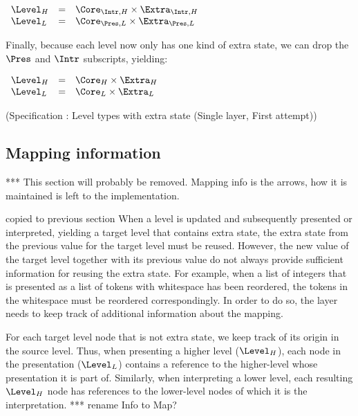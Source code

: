\begin{small}\( \begin{array}{lcll}
\Level_{H} & = & \Core_{\Intr, H} \times \Extra_{\Intr, H}\\
\Level_{L} & = & \Core_{\Pres, L} \times \Extra_{\Pres, L}\\
\end{array}\)\end{small}

Finally, because each level now only has one kind of extra state, we can drop the $\Pres$ and $\Intr$ subscripts, yielding:

\begin{small}
 \label{spec:levelSingleFirst}
\( \begin{array}{lcll}
\Level_{H} & = & \Core_{H} \times \Extra_{H}\\
\Level_{L} & = & \Core_{L} \times \Extra_{L}\\
\end{array}\)\end{small}
\begin{center}(Specification \thespecification: Level types with extra state (Single layer, First attempt))\end{center}
\ec



\bc
%																
\subsection{Mapping information} \label{sect:mappingInformation}

*** This section will probably be removed. Mapping info is the arrows, how it is maintained is left to the implementation.
\ec

\bc     copied to previous section
When a level is updated and subsequently presented or interpreted, yielding a target level that contains extra state, the extra state from the previous value for the target level must be reused. However, the new value of the target level together with its previous value do not always provide sufficient information for reusing the extra state. For example, when a list of integers that is presented as a list of tokens with whitespace has been reordered, the tokens in the whitespace must be reordered correspondingly.  In order to do so, the layer needs to keep track of additional information about the mapping.

For each target level node that is not extra state, we keep track of its origin in the source level. Thus, when presenting a higher level ($\Level_{H}$), each node in the presentation ($\Level_{L}$) contains a reference to the higher-level whose presentation it is part of. Similarly, when interpreting a lower level, each resulting $\Level_{H}$ node has references to the lower-level nodes of which it is the interpretation. 
\ec
\bc
*** rename Info to Map?

